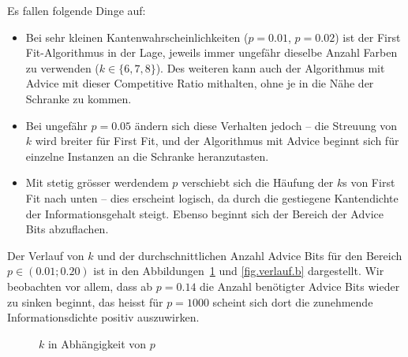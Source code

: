 \documentclass[11pt,abstracton]{scrreprt} %
\theoremstyle{definition}
\begin{document}
Es fallen folgende Dinge auf:

\begin{itemize}
\item Bei sehr kleinen Kantenwahrscheinlichkeiten ($p = 0.01$, $p = 0.02$) ist der First Fit-Algorithmus in der Lage, jeweils immer ungefähr dieselbe Anzahl Farben zu verwenden ($k \in \{6,7,8\}$). Des weiteren kann auch der Algorithmus mit Advice mit dieser Competitive Ratio mithalten, ohne je in die Nähe der Schranke zu kommen.
\item Bei ungefähr $p = 0.05$ ändern sich diese Verhalten jedoch -- die Streuung von $k$ wird breiter für First Fit, und der Algorithmus mit Advice beginnt sich für einzelne Instanzen an die Schranke heranzutasten.
\item Mit stetig grösser werdendem $p$ verschiebt sich die Häufung der $k$s von First Fit nach unten -- dies erscheint logisch, da durch die gestiegene Kantendichte der Informationsgehalt steigt. Ebenso beginnt sich der Bereich der Advice Bits abzuflachen.
\end{itemize}

Der Verlauf von $k$ und der durchschnittlichen Anzahl Advice Bits für den Bereich $p \in (0.01; 0.20 ) $ ist in den Abbildungen~\ref{fig.verlauf} und \ref{fig.verlauf.b} dargestellt. Wir beobachten vor allem, dass ab $p = 0.14$ die Anzahl benötigter Advice Bits wieder zu sinken beginnt, das heisst für $p = 1000$ scheint sich dort die zunehmende Informationsdichte positiv auszuwirken.

\begin{figure}
\caption{$k$  in Abhängigkeit von $p$}
\label{fig.verlauf}
\centering


\end{figure}
\end{document}
